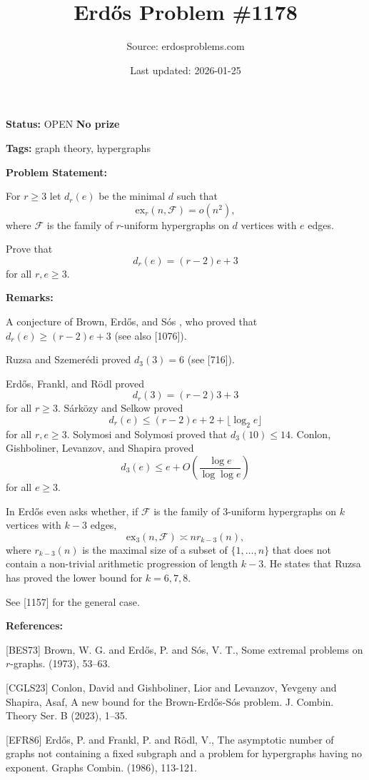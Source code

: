 \documentclass{article}
\title{Erd\H{o}s Problem \#1178}
\date{Last updated: 2026-01-25}
\author{Source: erdosproblems.com}
\begin{document}
\maketitle

\noindent\textbf{Status:} OPEN \quad \textbf{No prize}

\noindent\textbf{Tags:} graph theory, hypergraphs

\medskip
\noindent\textbf{Problem Statement:}

For $r\geq 3$ let $d_r(e)$ be the minimal $d$ such that\[\mathrm{ex}_r(n,\mathcal{F})=o(n^2),\]where $\mathcal{F}$ is the family of $r$-uniform hypergraphs on $d$ vertices with $e$ edges.

Prove that\[d_r(e)=(r-2)e+3\]for all $r,e\geq 3$.

\bigskip
\noindent\textbf{Remarks:}

A conjecture of Brown, Erd\H{o}s, and S\'{o}s \cite{BES73}, who proved that $d_r(e)\geq (r-2)e+3$ (see also [1076]).

Ruzsa and Szemer\'{e}di \cite{RuSz78} proved $d_3(3)=6$ (see [716]).

Erd\H{o}s, Frankl, and R\"{o}dl \cite{EFR86} proved\[d_r(3)= (r-2)3+3\]for all $r\geq 3$. S\'{a}rk\"{o}zy and Selkow \cite{SaSe05} proved\[d_r(e) \leq (r-2)e+2+\lfloor \log_2 e\rfloor\]for all $r,e\geq 3$. Solymosi and Solymosi \cite{SoSo17} proved that $d_3(10)\leq 14$. Conlon, Gishboliner, Levanzov, and Shapira \cite{CGLS23} proved\[d_3(e)\leq e+O\left(\frac{\log e}{\log\log e}\right)\]for all $e\geq 3$.

In \cite{Er75b} Erd\H{o}s even asks whether, if $\mathcal{F}$ is the family of $3$-uniform hypergraphs on $k$ vertices with $k-3$ edges,\[\mathrm{ex}_3(n,\mathcal{F})\asymp n r_{k-3}(n),\]where $r_{k-3}(n)$ is the maximal size of a subset of $\{1,\ldots,n\}$ that does not contain a non-trivial arithmetic progression of length $k-3$. He states that Ruzsa has proved the lower bound for $k=6,7,8$.

See [1157] for the general case.

\bigskip
\noindent\textbf{References:}

[BES73] Brown, W. G. and Erd\H{o}s, P. and S\'os, V. T., Some extremal problems on {$r$}-graphs. (1973), 53--63.
 
 [CGLS23] Conlon, David and Gishboliner, Lior and Levanzov, Yevgeny and
Shapira, Asaf, A new bound for the {B}rown-{E}rd\H os-S\'os problem. J. Combin. Theory Ser. B (2023), 1--35.
 
 [EFR86] Erd\H{o}s, P. and Frankl, P. and R\"{o}dl, V., The asymptotic number of graphs not containing a fixed subgraph and a problem for hypergraphs having no exponent. Graphs Combin. (1986), 113-121.
 
\end{document}
